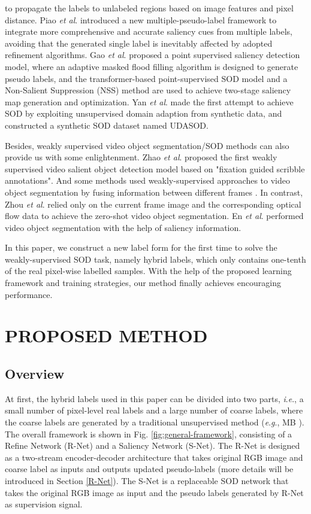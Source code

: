 \documentclass[journal]{IEEEtran}
\newcommand{\etal}{\textit{et al}.}
\newcommand{\ie}{\textit{i}.\textit{e}.}
\newcommand{\eg}{\textit{e}.\textit{g}.}
\begin{document}
to propagate the labels to unlabeled regions based on image features and pixel distance. Piao \etal \cite{DBLP:conf/iccv/PiaoWZL21} introduced a new multiple-pseudo-label framework to integrate more comprehensive and accurate saliency cues from multiple labels, avoiding that the generated single label is inevitably affected by adopted refinement algorithms. Gao \etal \cite{DBLP:conf/aaai/Gao00GZHZ22} proposed a point supervised saliency detection model, where an adaptive masked flood filling algorithm is designed to generate pseudo labels, and the transformer-based point-supervised SOD model and a Non-Salient Suppression (NSS) method are used to achieve two-stage saliency map generation and optimization. Yan \etal\cite{DBLP:conf/aaai/YanWLZLL22} made the first attempt to achieve SOD by exploiting unsupervised domain adaption from synthetic data, and constructed a synthetic SOD dataset named UDASOD.

Besides, weakly supervised video object segmentation/SOD methods can also provide us with some enlightenment. Zhao \etal \cite{DBLP:conf/cvpr/Zhao0LBLH21} proposed the first weakly supervised video salient object detection model based on "fixation guided scribble annotations".
And some methods used weakly-supervised approaches to video object segmentation by fusing information between different frames \cite{DBLP:journals/tcsv/LinXLZ22,DBLP:journals/tist/WeiLLFWC22,DBLP:conf/aaai/LinX0021}. In contrast, Zhou \etal \cite{DBLP:conf/aaai/ZhouWZYL020} relied
only on the current frame image and the corresponding optical flow data to achieve the zero-shot video object segmentation.
En \etal \cite{DBLP:journals/tip/EnDZ21} performed video object segmentation with the help of saliency information.

In this paper, we construct a new label form for the first time to solve the weakly-supervised SOD task, namely hybrid labels, which only contains one-tenth of the real pixel-wise labelled samples. With the help of the proposed learning framework and training strategies, our method finally achieves encouraging performance.




\section{PROPOSED METHOD}
\subsection{Overview}
At first, the hybrid labels used in this paper can be divided into two parts, \ie, a small number of pixel-level real labels and a large number of coarse labels, where the coarse labels are generated by a traditional unsupervised method (\eg, MB \cite{zhang2015minimum}). The overall framework is shown in Fig. \ref{fig:general-framework}, consisting of a Refine Network (R-Net) and a Saliency Network (S-Net). The R-Net is designed as a two-stream encoder-decoder architecture that takes original RGB image and coarse label as inputs and outputs updated pseudo-labels (more details will be introduced in Section \ref{R-Net}). The S-Net is a replaceable SOD network that takes the original RGB image as input and the pseudo labels generated by R-Net as supervision signal.
\end{document}
